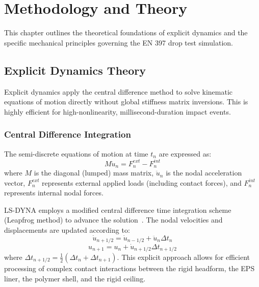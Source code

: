 \chapter{Methodology and Theory}

This chapter outlines the theoretical foundations of explicit dynamics and the specific mechanical principles governing the EN 397 drop test simulation.

\section{Explicit Dynamics Theory}
Explicit dynamics apply the central difference method to solve kinematic equations of motion directly without global stiffness matrix inversions. This is highly efficient for high-nonlinearity, millisecond-duration impact events.

\subsection{Central Difference Integration}
The semi-discrete equations of motion at time $t_n$ are expressed as:
\begin{equation}
    M \ddot{u}_n = F^{ext}_n - F^{int}_n
\end{equation}
where $M$ is the diagonal (lumped) mass matrix, $\ddot{u}_n$ is the nodal acceleration vector, $F^{ext}_n$ represents external applied loads (including contact forces), and $F^{int}_n$ represents internal nodal forces.

LS-DYNA employs a modified central difference time integration scheme (Leapfrog method) to advance the solution~\cite{lsdyna2021}. The nodal velocities and displacements are updated according to:
\begin{equation}
    \dot{u}_{n+1/2} = \dot{u}_{n-1/2} + \ddot{u}_n \Delta t_n
\end{equation}
\begin{equation}
    u_{n+1} = u_n + \dot{u}_{n+1/2} \Delta t_{n+1/2}
\end{equation}
where $\Delta t_{n+1/2} = \frac{1}{2}(\Delta t_n + \Delta t_{n+1})$. This explicit approach allows for efficient processing of complex contact interactions between the rigid headform, the EPS liner, the polymer shell, and the rigid ceiling.

